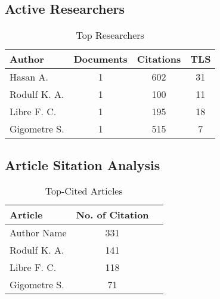 \documentclass[journal, a4paper]{IEEEtran}
\begin{document}
\subsection{Active Researchers}
\lipsum[1]

\begin{table}[htbp]

  \centering
  \caption{Top Researchers}
  \label{tbl:bresearchers}
  \begin{tabular}{lccc}

      \toprule
      \textbf{Author} & \textbf{Documents} & \textbf{Citations} & \textbf{TLS} \\
      \midrule
      Hasan A.                   & 1     & 602   &  31         \\
      Rodulf K. A.               & 1     & 100   &  11         \\
      Libre F. C.                & 1     & 195   &  18         \\
      Gigometre S.               & 1     & 515   &  7          \\
      \bottomrule
  \end{tabular}
\end{table}

\lipsum[1]


\subsection{Article Sitation Analysis}
\lipsum[1]

\begin{table}[htbp]

  \centering
  \caption{Top-Cited Articles}
  \label{tbl:articleCites}
  \begin{tabular}{lcc}

      \toprule
      \textbf{Article} & \textbf{No. of Citation} \\
      \midrule
      Author Name       \cite{Hu2023}           &    331         \\
      Rodulf K. A.      \cite{Lingxin2022}      &    141         \\
      Libre F. C.       \cite{Entezami2020}     &    118         \\
      Gigometre S.      \cite{Lee2023}          &    71          \\
      \bottomrule
  \end{tabular}
\end{table}

\lipsum[1]
\end{document}
